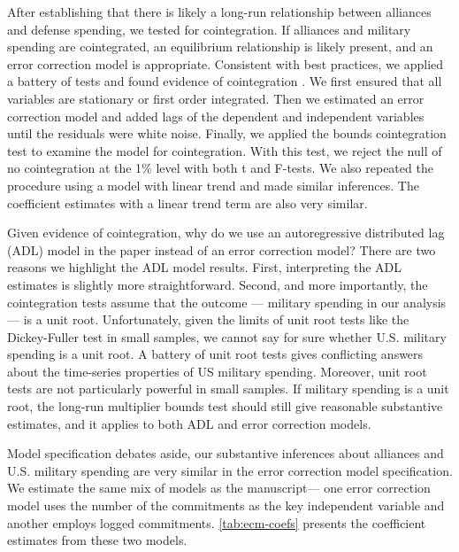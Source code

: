 \documentclass[12pt]{article}
\begin{document}
After establishing that there is likely a long-run relationship between alliances and defense spending, we tested for cointegration. 
If alliances and military spending are cointegrated, an equilibrium relationship is likely present, and an error correction model is appropriate.    
Consistent with best practices, we applied a battery of tests and found evidence of cointegration \citep{Philips2018}. 
We first ensured that all variables are stationary or first order integrated. 
Then we estimated an error correction model and added lags of the dependent and independent variables until the residuals were white noise. 
Finally, we applied the bounds cointegration test to examine the model for cointegration. With this test, we reject the null of no cointegration at the 1\% level with both t and F-tests. 
We also repeated the procedure using a model with linear trend and made similar inferences. 
The coefficient estimates with a linear trend term are also very similar.


Given evidence of cointegration, why do we use an autoregressive distributed lag (ADL) model in the paper instead of an error correction model? 
There are two reasons we highlight the ADL model results. 
First, interpreting the ADL estimates is slightly more straightforward. 
Second, and more importantly, the cointegration tests assume that the outcome --- military spending in our analysis --- is a unit root. 
Unfortunately, given the limits of unit root tests like the Dickey-Fuller test in small samples, we cannot say for sure whether U.S. military spending is a unit root. 
A battery of unit root tests gives conflicting answers about the time-series properties of US military spending. 
Moreover, unit root tests are not particularly powerful in small samples. 
If military spending is a unit root, the long-run multiplier bounds test should still give reasonable substantive estimates, and it applies to both ADL and error correction models.


Model specification debates aside, our substantive inferences about alliances and U.S. military spending are very similar in the error correction model specification.
We estimate the same mix of models as the manuscript--- one error correction model uses the number of the commitments as the key independent variable and another employs logged commitments. 
\autoref{tab:ecm-coefs} presents the coefficient estimates from these two models. 
\end{document}
